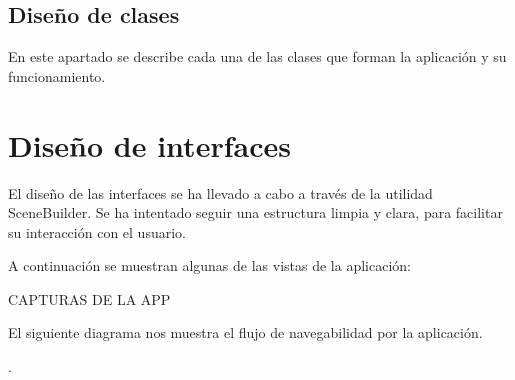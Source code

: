 



\subsection{Diseño de clases}

En este apartado se describe cada una de las clases que forman la aplicación y su funcionamiento.



\section{Diseño de interfaces}

El diseño de las interfaces se ha llevado a cabo a través de la utilidad SceneBuilder. Se ha intentado seguir una estructura limpia y clara, para facilitar su interacción con el usuario.

A continuación se muestran algunas de las vistas de la aplicación:

CAPTURAS DE LA APP

El siguiente diagrama nos muestra el flujo de navegabilidad por la aplicación.


.


